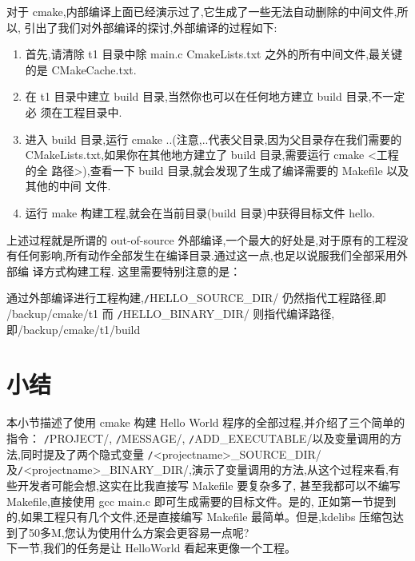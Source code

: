 \documentclass[oneside, 12pt]{book}
\begin{document}
对于 cmake,内部编译上面已经演示过了,它生成了一些无法自动删除的中间文件,所以, 引出了我们对外部编译的探讨,外部编译的过程如下:
\begin{enumerate}
  \item 首先,请清除 t1 目录中除 main.c CmakeLists.txt 之外的所有中间文件,最关键 的是 CMakeCache.txt.
  \item 在 t1 目录中建立 build 目录,当然你也可以在任何地方建立 build 目录,不一定必 须在工程目录中.
  \item 进入 build 目录,运行 cmake ..(注意,..代表父目录,因为父目录存在我们需要的 CMakeLists.txt,如果你在其他地方建立了 build 目录,需要运行 cmake <工程的全 路径>),查看一下 build 目录,就会发现了生成了编译需要的 Makefile 以及其他的中间 文件.
  \item 运行 make 构建工程,就会在当前目录(build 目录)中获得目标文件 hello.
\end{enumerate}
上述过程就是所谓的 out-of-source 外部编译,一个最大的好处是,对于原有的工程没 有任何影响,所有动作全部发生在编译目录.通过这一点,也足以说服我们全部采用外部编 译方式构建工程. 这里需要特别注意的是：

通过外部编译进行工程构建,\texttt/HELLO_SOURCE_DIR/ 仍然指代工程路径,即 /backup/cmake/t1 而 \texttt/HELLO_BINARY_DIR/ 则指代编译路径,即/backup/cmake/t1/build
\section{小结}
本小节描述了使用 cmake 构建 Hello World 程序的全部过程,并介绍了三个简单的指令：
\texttt/PROJECT/, \texttt/MESSAGE/, \texttt/ADD_EXECUTABLE/以及变量调用的方法,同时提及了两个隐式变量 \texttt/<projectname>_SOURCE_DIR/\\
及\texttt/<projectname>_BINARY_DIR/,演示了变量调用的方法,从这个过程来看,有些开发者可能会想,这实在比我直接写 Makefile 要复杂多了, 甚至我都可以不编写 Makefile,直接使用 gcc main.c 即可生成需要的目标文件。是的, 正如第一节提到的,如果工程只有几个文件,还是直接编写 Makefile 最简单。但是,kdelibs 压缩包达到了50多M,您认为使用什么方案会更容易一点呢?\\

下一节,我们的任务是让 HelloWorld 看起来更像一个工程。
\end{document}

